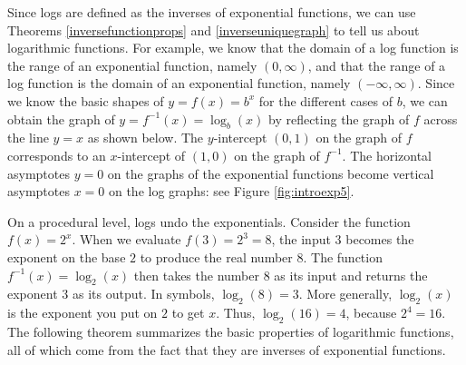 \smallskip

Since logs are defined as the inverses of exponential functions, we can use Theorems \ref{inversefunctionprops} and \ref{inverseuniquegraph} to tell us about logarithmic functions.  For example, we know that the domain of a log function is the range of an exponential function, namely $(0, \infty)$, and that the range of a log function is the domain of an exponential function, namely $(-\infty, \infty)$.   Since we know the basic shapes of $y = f(x) = b^{x}$ for the different cases of $b$, we can obtain the graph of $y = f^{-1}(x) = \log_{b}(x)$ by reflecting the graph of $f$ across the line $y=x$ as shown below.  The $y$-intercept $(0,1)$ on the graph of $f$  corresponds to an $x$-intercept of $(1,0)$ on the graph of $f^{-1}$.  The horizontal asymptotes $y=0$ on the graphs of the exponential functions become vertical asymptotes $x=0$ on the log graphs: see Figure \ref{fig:introexp5}.  



On a procedural level, logs undo the exponentials.  Consider the function $f(x) = 2^{x}$.  When we evaluate $f(3) = 2^{3} = 8$, the input $3$ becomes the exponent on the base $2$ to produce the real number $8$.  The function $f^{-1}(x) = \log_{2}(x)$ then takes the number $8$ as its input and returns the exponent $3$ as its output.  In symbols, $\log_{2}(8) = 3$. More generally, $\log_{2}(x)$ is the exponent you put on $2$ to get $x$.  Thus, $\log_{2}(16) = 4$, because $2^{4} = 16$.  The following theorem summarizes the basic properties of logarithmic functions, all of which come from the fact that they are inverses of exponential functions. 

\smallskip

